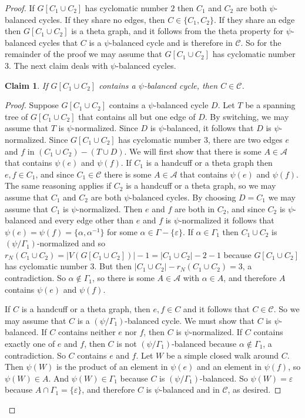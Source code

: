 \documentclass[12pt]{article}
\newtheorem{claim}{Claim}[theorem]
\theoremstyle{definition}
\newcommand{\cA}{\mathcal{A}}
\newcommand{\cC}{\mathcal{C}}
\newcommand{\ep}{\varepsilon}
\begin{document}
\begin{proof}
If $G[C_1 \cup C_2]$ has cyclomatic number $2$ then $C_1$ and $C_2$ are both $\psi$-balanced cycles.
If they share no edges, then $C \in \{C_1, C_2\}$.
If they share an edge then $G[C_1 \cup C_2]$ is a theta graph, and it follows from the theta property for $\psi$-balanced cycles that $C$ is a $\psi$-balanced cycle and is therefore in $\cC$.
So for the remainder of the proof we may assume that $G[C_1 \cup C_2]$ has cyclomatic number $3$.
The next claim deals with $\psi$-balanced cycles.





\begin{claim} \label{claim: no balanced cycles}
If $G[C_1 \cup C_2]$ contains a $\psi$-balanced cycle, then $C \in \cC$.
\end{claim}
\begin{proof}
Suppose $G[C_1 \cup C_2]$ contains a $\psi$-balanced cycle $D$.
Let $T$ be a spanning tree of $G[C_1 \cup C_2]$ that contains all but one edge of $D$.
By switching, we may assume that $T$ is $\psi$-normalized.
Since $D$ is $\psi$-balanced, it follows that $D$ is $\psi$-normalized.
Since $G[C_1 \cup C_2]$ has cyclomatic number $3$, there are two edges $e$ and $f$ in $(C_1 \cup C_2) - (T \cup D)$.
We will first show that there is some $A \in \cA$ that contains $\psi(e)$ and $\psi(f)$.
If $C_1$ is a handcuff or a theta graph then $e,f \in C_1$, and since $C_1 \in \cC$ there is some $A \in \cA$ that contains $\psi(e)$ and $\psi(f)$.
The same reasoning applies if $C_2$ is a handcuff or a theta graph, so we may assume that $C_1$ and $C_2$ are both $\psi$-balanced cycles.
By choosing $D = C_1$ we may assume that $C_1$ is $\psi$-normalized.
Then $e$ and $f$ are both in $C_2$, and since $C_2$ is $\psi$-balanced and every edge other than $e$ and $f$ is $\psi$-normalized it follows that $\psi(e) = \psi(f) = \{\alpha, \alpha^{-1}\}$ for some $\alpha \in \Gamma - \{\ep\}$.
If $\alpha \in \Gamma_1$ then $C_1 \cup C_2$ is $(\psi/\Gamma_1)$-normalized and so $r_N(C_1 \cup C_2) = |V(G[C_1 \cup C_2])| - 1 = |C_1 \cup C_2| - 2 - 1$ because $G[C_1 \cup C_2]$ has cyclomatic number $3$.
But then $|C_1 \cup C_2| - r_N(C_1 \cup C_2) = 3$, a contradiction.
So $\alpha \notin \Gamma_1$, so there is some $A \in \cA$ with $\alpha \in A$, and therefore $A$ contains $\psi(e)$ and $\psi(f)$.



If $C$ is a handcuff or a theta graph, then $e,f \in C$ and it follows that $C \in \cC$.
So we may assume that $C$ is a $(\psi/\Gamma_1)$-balanced cycle.
We must show that $C$ is $\psi$-balanced.
If $C$ contains neither $e$ nor $f$, then $C$ is $\psi$-normalized.
If $C$ contains exactly one of $e$ and $f$, then $C$ is not $(\psi/\Gamma_1)$-balanced because $\alpha \notin \Gamma_1$, a contradiction.
So $C$ contains $e$ and $f$.
Let $W$ be a simple closed walk around $C$.
Then $\psi(W)$ is the product of an element in $\psi(e)$ and an element in $\psi(f)$, so $\psi(W) \in A$.
And $\psi(W) \in \Gamma_1$ because $C$ is $(\psi/\Gamma_1)$-balanced.
So $\psi(W) = \ep$ because $A \cap \Gamma_1 = \{\ep\}$, and therefore $C$ is $\psi$-balanced and in $\cC$, as desired.
\end{proof}




\end{proof}
\end{document}
